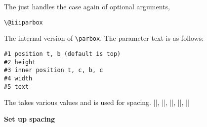 The  just handles the case again of optional arguments,

\begin{teX}
\def\@iparbox[#1]{%
   \@ifnextchar[%
   {\@iiparbox{#1}}%
   {\@iiiparbox{#1}\relax[s]}}
\end{teX}


  

\begin{teX}
\def\@iiparbox#1[#2]{%
   \@ifnextchar[%
   {\@iiiparbox{#1}{#2}}%
   {\@iiiparbox{#1}{#2}[#1]}}
\end{teX}

\begin{teX}
   \let\@parboxto\@empty
\end{teX}

\hspace{-1cm}\texttt{\textbackslash @iiiparbox}

The internal version of \texttt{\textbackslash parbox}. The parameter text is as follows:

\begin{verbatim}
#1 position t, b (default is top)
#2 height
#3 inner position t, c, b, c
#4 width
#5 text
\end{verbatim}

\begin{teX}
  \long{}
\end{teX}

\noindent The  takes various values and is used for spacing. 
|\bm@l|, |\bm@r|, |\bm@s|, |\bm@t|, |\bm@b|


\textbf{Set up spacing}

\begin{teX}
  \def\bm@c{\hss\unhbox\@tempboxa\hss}
  \def\bm@l{\unhbox\@tempboxa\hss}\let\bm@t\bm@l
  \def\bm@r{\hss\unhbox\@tempboxa}\let\bm@b\bm@r
  \def\bm@s{\unhbox\@tempboxa}
\end{teX}


